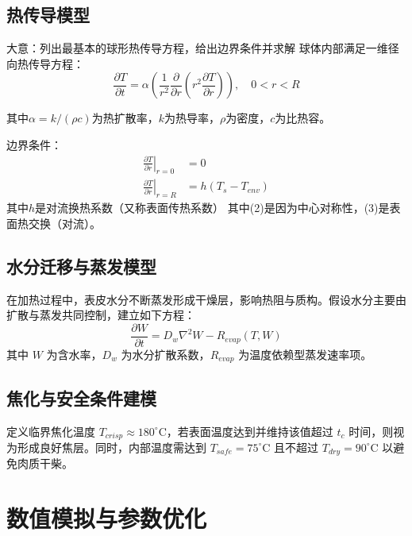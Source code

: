 \documentclass[12pt]{article}
\begin{document}
\subsection{热传导模型}
大意：列出最基本的球形热传导方程，给出边界条件并求解
球体内部满足一维径向热传导方程：
\begin{equation}
\frac{\partial T}{\partial t} = \alpha \left( \frac{1}{r^2} \frac{\partial}{\partial r}\left(r^2 \frac{\partial T}{\partial r} \right) \right), \quad 0 < r < R
\label{eq:1}
\end{equation}
\par 其中\(\alpha = k/(\rho c)\)为热扩散率，$k$为热导率，\(\rho\)为密度，$c$为比热容。
\par 边界条件：
\begin{align}
\left.\frac{\partial T}{\partial r}\right|_{r=0} &= 0 \\
\left.\frac{\partial T}{\partial r}\right|_{r=R} &= h(T_s - T_{env})
\end{align}
其中$h$是对流换热系数（又称表面传热系数）
其中(2)是因为中心对称性，(3)是表面热交换（对流）。

\subsection{水分迁移与蒸发模型}
在加热过程中，表皮水分不断蒸发形成干燥层，影响热阻与质构。假设水分主要由扩散与蒸发共同控制，建立如下方程：
\begin{equation}
\frac{\partial W}{\partial t} = D_w \nabla^2 W - R_{evap}(T, W)
\end{equation}
其中 $W$ 为含水率，$D_w$ 为水分扩散系数，$R_{evap}$ 为温度依赖型蒸发速率项。

\subsection{焦化与安全条件建模}

定义临界焦化温度 $T_{crisp} \approx 180^\circ$C，若表面温度达到并维持该值超过 $t_c$ 时间，则视为形成良好焦层。同时，内部温度需达到 $T_{safe} = 75^\circ$C 且不超过 $T_{dry} = 90^\circ$C 以避免肉质干柴。

\section{数值模拟与参数优化}
\end{document}
